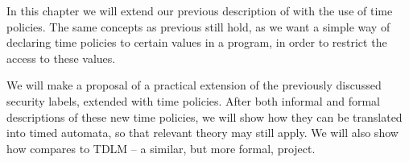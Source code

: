 
In this chapter we will extend our previous description of \thelang{} with the use of time policies.
The same concepts as previous still hold, as we want a simple way of declaring time policies to certain values in a program, in order to restrict the access to these values.

We will make a proposal of a practical extension of the previously discussed security labels, extended with time policies.
After both informal and formal descriptions of these new time policies, we will show how they can be translated into timed automata, so that relevant theory may still apply.
We will also show how \thelang{} compares to TDLM -- a similar, but more formal, project.
